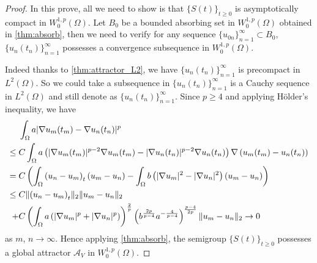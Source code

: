\documentclass[11pt]{amsart}
\theoremstyle{definition}
\numberwithin{equation}{section}
\newcommand*\abs[1]{\lvert#1\rvert}
\newcommand*\norm[1]{\lVert#1\rVert}
\newcommand*\Brace[1]{\lbrace#1\rbrace}
\begin{document}
\begin{proof}
	In this prove, all we need to show is that $\Brace{S(t)}_{t \geq 0}$ is
	asymptotically compact in $W_0^{1,p}(\Omega)$.
	Let $B_0$ be a bounded absorbing set in $W_0^{1,p}(\Omega)$ obtained in
	\cref{thm:absorb}, then we need to verify for any sequence
	$\Brace{u_{0n}}_{n=1}^{\infty} \subset B_0$, $\Brace{u_n(t_n)}_{n=1}^{\infty}$
	possesses a convergence subsequence in $W_0^{1,p}(\Omega)$.

	Indeed thanks to \cref{thm:attractor_L2}, we have
	$\Brace{u_n(t_n)}_{n=1}^{\infty}$ is precompact in $L^2(\Omega)$.
	So we could take a subsequence in $\Brace{u_n(t_n)}_{n=1}^{\infty}$ is a
	Cauchy sequence in $L^2(\Omega)$
	and still denote as $\Brace{u_n(t_n)}_{n=1}^{\infty}$. Since $p \geq 4$ and
	applying H\"older's inequality, we have
	\begin{equation*}
		\begin{split}
			& \int_{\Omega}a\abs{\nabla u_m(t_m) - \nabla u_n(t_n)}^p\\
			\leq{} & C\int_{\Omega}a
			\left(\abs{\nabla u_m(t_m)}^{p-2}\nabla u_m(t_m)
			- \abs{\nabla u_n(t_n)}^{p-2}\nabla u_n(t_n)\right)
			\*\nabla\left(u_m(t_m) - u_n(t_n)\right)\\
			={} & C\left(\int_{\Omega}\left(u_n-u_m\right)_t\left(u_m-u_n\right)
			- \int_{\Omega}b\left(\abs{\nabla u_m}^2 - \abs{\nabla u_n}^2\right)
			\left(u_m - u_n\right)\right)\\
			\leq{} & C\norm{\left(u_n-u_m\right)_t}_2\norm{u_m-u_n}_2\\
			+{} & C\left(\int_{\Omega}a\left(\abs{\nabla u_m}^p
			+ \abs{\nabla u_n}^p\right)\right)^{\frac{2}{p}}
			\left(b^{\frac{2p}{p-4}}a^{-\frac{4}{p-4}}\right)^{\frac{p-4}{2p}}
			\norm{u_m-u_n}_2 \to 0
		\end{split}
	\end{equation*}
	as $m$, $n \to \infty$. Hence applying \cref{thm:absorb}, the semigroup $\Brace{S(t)}_{t \geq 0}$
	possesses a global attractor $\mathcal{A}_V$ in $W_0^{1,p}(\Omega)$.
\end{proof}


\end{document}
